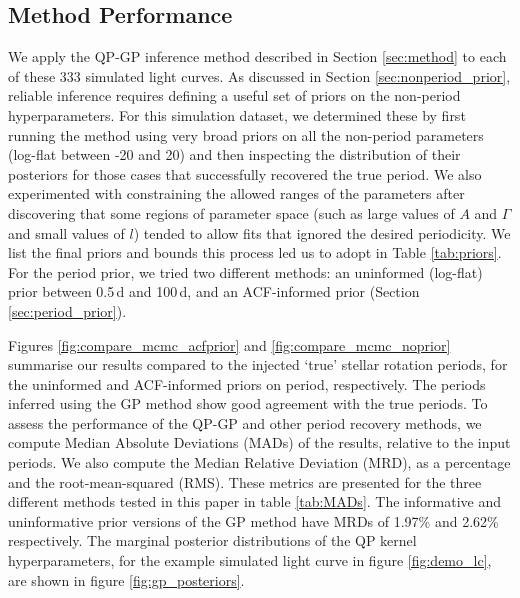 \documentclass[a4paper,fleqn,usenatbib,useAMS]{mnras}
\newcommand{\percentgpMAD}{1.97}
\newcommand{\percentgpMADnp}{2.62}
\newcommand{\vrcomment}[1]{{\color{magenta}#1}}
\begin{document}
\subsection{Method Performance}
\label{sec:performance}

We apply the QP-GP inference method described in Section \ref{sec:method}
to each of these 333 simulated light curves.  As discussed in Section
\ref{sec:nonperiod_prior}, reliable inference
requires defining a useful set of priors on the non-period
hyperparameters.
For this simulation dataset, we determined these by first running
the method using very broad priors on all the non-period parameters
(log-flat between -20 and 20)
and then inspecting the distribution of their posteriors for those cases
that successfully recovered the true period.
We also experimented with constraining the allowed ranges of the parameters
after discovering that some regions of parameter space (such as large values
of $A$ and $\Gamma$ and small values of $l$) tended to allow fits that ignored
the desired periodicity.
We list the final priors and bounds this process led us to adopt
in Table \ref{tab:priors}.
For the period prior, we tried two different methods: an uninformed (log-flat)
prior between 0.5\,d and 100\,d, and an ACF-informed prior
(Section \ref{sec:period_prior}).

Figures \ref{fig:compare_mcmc_acfprior} and \ref{fig:compare_mcmc_noprior}
summarise our results compared to the injected `true' stellar rotation
periods, for the uninformed and ACF-informed priors on period, respectively.
The periods inferred using the GP method show good agreement with the true
periods.
To assess the performance of the QP-GP and other period recovery methods, we
compute Median Absolute Deviations (MADs) of the results, relative to the
input periods.
We also compute the Median Relative Deviation (MRD), as a percentage and the
root-mean-squared (RMS).
These metrics are presented for the three different methods tested in this
paper in table \ref{tab:MADs}.
The informative and uninformative prior versions of the GP method have MRDs of
\percentgpMAD \% and \percentgpMADnp \% respectively.
The marginal posterior distributions of the QP kernel hyperparameters, for the
example simulated light curve in figure \ref{fig:demo_lc}, are shown in
figure \ref{fig:gp_posteriors}.
\end{document}
